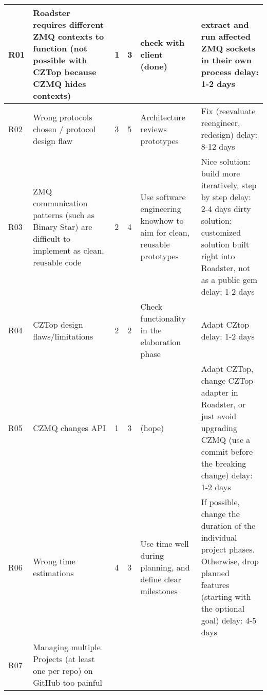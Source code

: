 \begin{center}
\begin{longtable}{|p{6mm}|p{30mm}|p{6mm}|p{8mm}|p{30mm}|p{64mm}|}
    \hline
    \endlastfoot
    R01
		& Roadster requires different ZMQ contexts to function (not possible with CZTop because CZMQ hides contexts)
		& \cellcolor{green!50}1
		& \cellcolor{green!50}3
		& check with client	(done)
		& extract and run affected ZMQ \newline sockets in their own process \newline delay: 1-2 days \\ \hline
	R02
		& Wrong protocols chosen / protocol design flaw
		& \cellcolor{orange!50}3
		& \cellcolor{orange!50}5
		& Architecture \newline reviews prototypes
		& Fix (reevaluate reengineer, redesign) \newline delay: 8-12 days	\\ \hline
	R03
		& ZMQ communication patterns (such as Binary Star) are difficult to implement as clean, reusable code
		& \cellcolor{yellow!50}2
		& \cellcolor{yellow!50}4
		& Use software engineering knowhow to aim for clean, reusable prototypes
		& Nice solution: \newline build more iteratively, step by step \newline delay: 2-4 days \newline \newline dirty solution:
		\newline customized solution built right into Roadster, not as a public gem \newline delay: 1-2 days \\ \hline
	R04
		& CZTop design flaws/limitations
		& \cellcolor{green!50}2
		& \cellcolor{green!50}2
		& Check functionality in the elaboration phase
		& Adapt CZtop \newline delay: 1-2 days \\ \hline
	R05
		& CZMQ changes API
		& \cellcolor{green!50}1
		& \cellcolor{green!50}3
		& (hope)
		& Adapt CZTop, change CZTop adapter in Roadster, or just avoid upgrading CZMQ (use a commit before the breaking change) \newline delay: 1-2 days \\ \hline
	R06
		& Wrong time estimations
		& \cellcolor{yellow!50}4
		& \cellcolor{yellow!50}3
		& Use time well during planning, and define clear milestones
		& If possible, change the duration of the individual project phases. Otherwise, drop planned features
		(starting with the optional goal) \newline delay: 4-5 days \\ \hline
	R07
		& Managing multiple Projects (at least one per repo) on GitHub too painful

\end{longtable}
\end{center}
